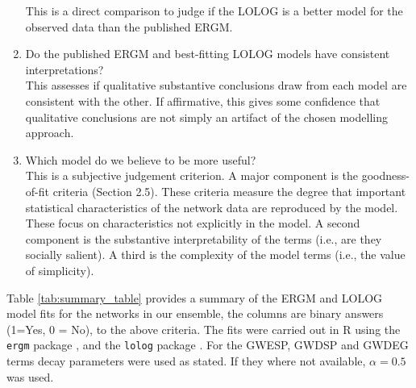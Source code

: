 \documentclass[
]{statsoc}
\begin{document}
\begin{enumerate}
This is a direct comparison to judge if the LOLOG is a better model for the observed data than the published ERGM.
\item Do the published ERGM and best-fitting LOLOG models have consistent interpretations?\\
This assesses if qualitative substantive conclusions draw from each model are consistent with the other.
If affirmative, this gives some confidence that qualitative conclusions are not simply an artifact of the chosen modelling approach.
\item Which model do we believe to be more useful?\\
This is a subjective judgement criterion. A major component is the goodness-of-fit criteria (Section 2.5). These criteria measure the degree that important statistical characteristics of the network data are reproduced by the model. These focus on characteristics not explicitly in the model. A second component is the substantive interpretability of the terms (i.e., are they socially salient). A third is the complexity of the model terms (i.e., the value of simplicity).
\end{enumerate}

Table \ref{tab:summary_table} provides a summary of the ERGM and LOLOG
model fits for the networks in our ensemble, the columns are binary
answers (1=Yes, 0 = No), to the above criteria. The fits were carried
out in R using the \texttt{ergm} package \citep{ergm_3_9_4}, and the
\texttt{lolog} package \citep{LOLOG_github}. For the GWESP, GWDSP and
GWDEG terms decay parameters were used as stated. If they where not
available, \(\alpha= 0.5\) was used.
\end{document}
